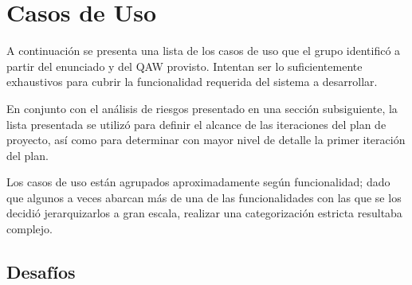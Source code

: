 \section{Casos de Uso}
A continuación se presenta una lista de los casos de uso que el grupo identificó a partir del enunciado y del QAW provisto. Intentan ser lo suficientemente exhaustivos para cubrir la funcionalidad requerida del sistema a desarrollar.

En conjunto con el análisis de riesgos presentado en una sección subsiguiente, la lista presentada se utilizó para definir el alcance de las iteraciones del plan de proyecto, así como para determinar con mayor nivel de detalle la primer iteración del plan.

Los casos de uso están agrupados aproximadamente según funcionalidad; dado que algunos a veces abarcan más de una de las funcionalidades con las que se los decidió jerarquizarlos a gran escala, realizar una categorización estricta resultaba complejo.




\subsection{Desafíos}
